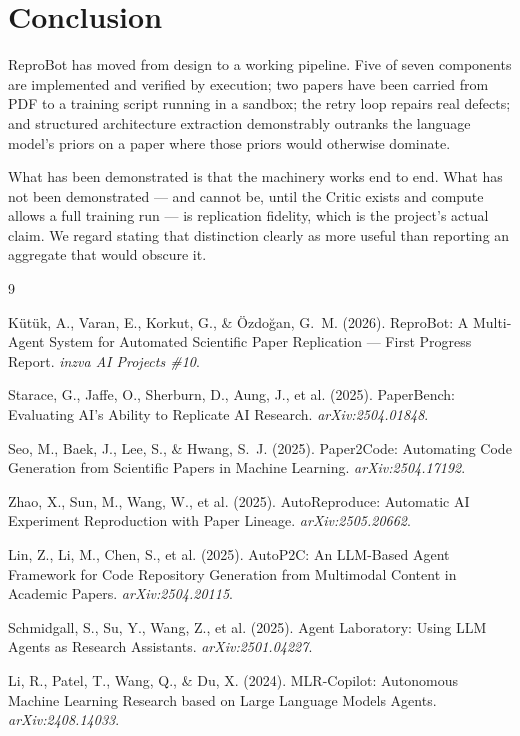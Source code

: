 \documentclass[11pt]{article}
\begin{document}
\section{Conclusion}
\label{sec:conclusion}

ReproBot has moved from design to a working pipeline. Five of seven components are
implemented and verified by execution; two papers have been carried from PDF to a
training script running in a sandbox; the retry loop repairs real defects; and structured
architecture extraction demonstrably outranks the language model's priors on a paper
where those priors would otherwise dominate.

What has been demonstrated is that the machinery works end to end. What has not been
demonstrated --- and cannot be, until the Critic exists and compute allows a full training
run --- is replication fidelity, which is the project's actual claim. We regard stating
that distinction clearly as more useful than reporting an aggregate that would obscure it.


\begin{thebibliography}{9}

Kütük, A., Varan, E., Korkut, G., \& Özdoğan, G.~M. (2026).
ReproBot: A Multi-Agent System for Automated Scientific Paper Replication --- First
Progress Report. \textit{inzva AI Projects \#10}.

Starace, G., Jaffe, O., Sherburn, D., Aung, J., et al. (2025).
PaperBench: Evaluating AI's Ability to Replicate AI Research.
\textit{arXiv:2504.01848}.

Seo, M., Baek, J., Lee, S., \& Hwang, S.~J. (2025).
Paper2Code: Automating Code Generation from Scientific Papers in Machine Learning.
\textit{arXiv:2504.17192}.

Zhao, X., Sun, M., Wang, W., et al. (2025).
AutoReproduce: Automatic AI Experiment Reproduction with Paper Lineage.
\textit{arXiv:2505.20662}.

Lin, Z., Li, M., Chen, S., et al. (2025).
AutoP2C: An LLM-Based Agent Framework for Code Repository Generation from Multimodal
Content in Academic Papers. \textit{arXiv:2504.20115}.

Schmidgall, S., Su, Y., Wang, Z., et al. (2025).
Agent Laboratory: Using LLM Agents as Research Assistants.
\textit{arXiv:2501.04227}.

Li, R., Patel, T., Wang, Q., \& Du, X. (2024).
MLR-Copilot: Autonomous Machine Learning Research based on Large Language Models Agents.
\textit{arXiv:2408.14033}.

\end{thebibliography}
\end{document}
